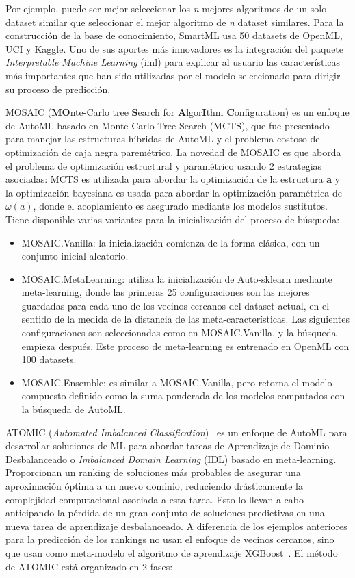 Por ejemplo, puede ser mejor seleccionar los \textit{n} mejores algoritmos de un solo dataset similar que seleccionar el mejor algoritmo de \textit{n} dataset similares. Para la construcción de la base de conocimiento, SmartML usa 50 datasets de OpenML, UCI y Kaggle. Uno de sus aportes más innovadores es la integración del paquete \textit{Interpretable Machine Learning} (iml) para explicar al usuario las características más importantes que han sido utilizadas por el modelo seleccionado para dirigir su proceso de predicción.

MOSAIC (\textbf{MO}nte-Carlo tree \textbf{S}earch for \textbf{A}lgor\textbf{I}thm \textbf{C}onfiguration) \cite{rakotoarison2019automated} es un enfoque de AutoML basado en Monte-Carlo Tree Search (MCTS), que fue presentado para manejar las estructuras híbridas de AutoML y el problema costoso de optimización de caja negra paremétrico. La novedad de MOSAIC es que aborda el problema de optimización estructural y paramétrico usando 2 estrategias asociadas: MCTS es utilizada para abordar la optimización de la estructura \textbf{a} y la optimización bayesiana es usada para abordar la optimización paramétrica de $\omega(a)$, donde el acoplamiento es asegurado mediante los modelos sustitutos. Tiene disponible varias variantes para la inicialización del proceso de búsqueda:

\begin{itemize}
	\item MOSAIC.Vanilla: la inicialización comienza de la forma clásica, con un conjunto inicial aleatorio.
	\item MOSAIC.MetaLearning: utiliza la inicialización de Auto-sklearn mediante meta-learning, donde las primeras 25 configuraciones son las mejores guardadas para cada uno de los vecinos cercanos del dataset actual, en el sentido de la medida de la distancia de las meta-características. Las siguientes configuraciones son seleccionadas como en MOSAIC.Vanilla, y la búsqueda empieza después. Este proceso de meta-learning es entrenado en OpenML con 100 datasets.
	\item MOSAIC.Ensemble: es similar a MOSAIC.Vanilla, pero retorna el modelo compuesto definido como la suma ponderada de los modelos computados con la búsqueda de AutoML.
\end{itemize}

ATOMIC (\textit{Automated Imbalanced Classification})~\cite{atomic} es un enfoque de AutoML para desarrollar soluciones de ML para abordar tareas de Aprendizaje de Dominio Desbalanceado o \textit{Imbalanced Domain Learning} (IDL) basado en meta-learning. Proporcionan un ranking de soluciones más probables de asegurar una aproximación óptima a un nuevo dominio, reduciendo drásticamente la complejidad computacional asociada a esta tarea. Esto lo llevan a cabo anticipando la pérdida de un gran conjunto de soluciones predictivas en una nueva tarea de aprendizaje desbalanceado. A diferencia de los ejemplos anteriores para la predicción de los rankings no usan el enfoque de vecinos cercanos, sino que usan como meta-modelo el algoritmo de aprendizaje XGBoost~\cite{xgboost}. El método de ATOMIC está organizado en 2 fases:

